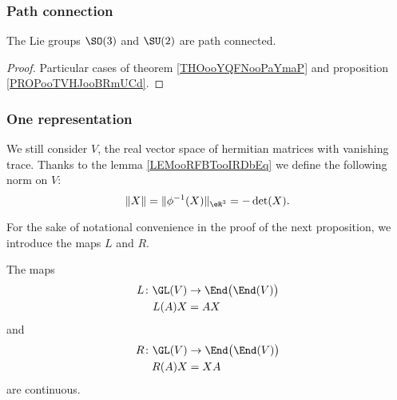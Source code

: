 \subsubsection{Path connection}

\begin{proposition}     \label{PROPooLEKXooSXPhRX}
    The Lie groups \( \SO(3)\) and \( \SU(2)\) are path connected.
\end{proposition}

\begin{proof}
    Particular cases of theorem \ref{THOooYQFNooPaYmaP} and proposition \ref{PROPooTVHJooBRmUCd}.
\end{proof}

\subsubsection{One representation}

We still consider \( V\), the real vector space of hermitian matrices with vanishing trace. Thanks to the lemma \ref{LEMooRFBTooIRDbEq} we define the following norm on \( V\):
\begin{equation}
    \| X \|=\| \phi^{-1}(X) \|_{\eR^3}=-\det(X).
\end{equation}

For the sake of notational convenience in the proof of the next proposition, we introduce the maps \( L\) and \( R\).
\begin{lemma}       \label{LEMooQVYXooQFNaGc}
    The maps
    \begin{equation}
        \begin{aligned}
            L\colon \GL(V)&\to \End\big( \End(V) \big) \\
            L(A)X&=AX
        \end{aligned}
    \end{equation}
    and
    \begin{equation}
        \begin{aligned}
            R\colon \GL(V)&\to \End\big( \End(V) \big) \\
            R(A)X&=XA
        \end{aligned}
    \end{equation}
    are continuous.
\end{lemma}

